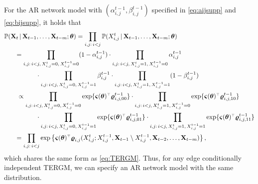 \documentclass[12pt]{article}
\newcommand{\bvarsigma}{\boldsymbol \varsigma}
\newcommand{\bvarrho}{\boldsymbol \varrho}
\newcommand{\btheta}{\boldsymbol \theta}
\def\T{{\scriptscriptstyle \top} }
\newcommand{\0}{{\bf 0}}
\begin{document}
For the AR network model with $(\alpha_{i,j}^{t-1},\beta_{i,j}^{t-1})$ specified in \eqref{eq:aijsupp} and \eqref{eq:bijsupp}, it holds that
\begin{align*}
   &\mathbb{P}({\bf X}_t\,|\, {\bf X}_{t-1}, \ldots, {\bf X}_{t-m} ; \btheta)
  = \prod_{i,j:\,i < j} \mathbb{P}(X_{i,j}^t \,|\, {\bf X}_{t-1}, \ldots, {\bf X}_{t-m} ; \btheta) \\
  &~~~~~= \prod_{i,j:\,i < j,\, X_{i,j}^{t}=0, \, X_{i,j}^{t-1}=0} (1 - \alpha_{i,j}^{t-1})\cdot \prod_{i,j:\,i < j,\, X_{i,j}^{t}=1,\, X_{i,j}^{t-1}=0} \alpha_{i,j}^{t-1} \\
  &~~~~~~~~~~~~~~~\cdot \prod_{i,j:\,i < j,\,X_{i,j}^{t}=0, \, X_{i,j}^{t-1}=1} \beta_{i,j}^{t-1} \cdot \prod_{i,j:\,i < j,\, X_{i,j}^{t}=1,\, X_{i,j}^{t-1}=1} (1- \beta_{i,j}^{t-1}) \\
  &~~~~~~\propto \prod_{i,j:\,i < j,\, X_{i,j}^{t}=0, \, X_{i,j}^{t-1}=0} \exp \{ \bvarsigma(\btheta)^{\T} \bvarrho_{i,j,00}^{t-1} \} \cdot \prod_{i,j:\,i < j,\, X_{i,j}^{t}=1,\, X_{i,j}^{t-1}=0} \exp \{ \bvarsigma(\btheta)^{\T} \bvarrho_{i,j,10}^{t-1} \} \\
  &~~~~~~~~~~~~~~~\cdot \prod_{i,j:\,i < j,\, X_{i,j}^{t}=0,\, X_{i,j}^{t-1}=1} \exp \{ \bvarsigma(\btheta)^{\T} \bvarrho_{i,j,01}^{t-1} \} \cdot \prod_{i,j:\,i < j,\, X_{i,j}^{t}=1,\, X_{i,j}^{t-1}=1} \exp \{ \bvarsigma(\btheta)^{\T} \bvarrho_{i,j,11}^{t-1} \} \\
  &~~~~~= \prod_{i,j:\,i < j} \exp \big\{ \bvarsigma(\btheta)^{\T} \bvarrho_{i,j}(X^t_{i,j} ; X_{i,j}^{t-1} , {\bf X}_{t-1} \setminus X_{i,j}^{t-1}, {\bf X}_{t-2}, \ldots, {\bf X}_{t-m} )\big\}\,,
\end{align*}
which shares the same form as \eqref{eq:TERGM}.
Thus, for any edge conditionally independent TERGM, we can specify an AR network model with the same distribution.
\end{document}
